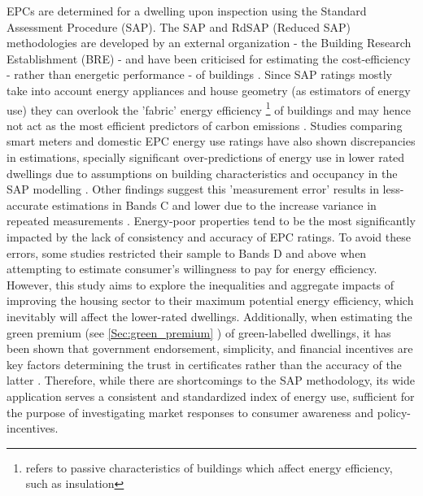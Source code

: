 EPCs are determined for a dwelling upon inspection using the Standard Assessment Procedure (SAP). The SAP and RdSAP (Reduced SAP) methodologies are developed by an external organization - the Building Research Establishment (BRE) - and have been criticised for estimating the cost-efficiency - rather than energetic performance - of buildings \cite{kelly_building_2012}. Since SAP ratings mostly take into account energy appliances and house geometry (as estimators of energy use) \cite{department_for_communities_and_local_government_guide_2017, bre_group_standard_nodate} they can overlook the 'fabric' energy efficiency \cite{bolton_energy_2024} \footnote{refers to passive characteristics of buildings which affect energy efficiency, such as insulation} of buildings and may hence not act as the most efficient predictors of carbon emissions \cite{stone_key_2014}. Studies comparing smart meters and domestic EPC energy use ratings have also shown discrepancies in estimations, specially significant over-predictions of energy use in lower rated dwellings due to assumptions on building characteristics and occupancy in the SAP modelling \cite{few_over-prediction_2023}. Other findings suggest this 'measurement error' results in less-accurate estimations in Bands C and lower due to the increase variance in repeated measurements \cite{crawley_quantifying_2019}. Energy-poor properties tend to be the most significantly impacted by the lack of consistency and accuracy of EPC ratings. To avoid these errors, some studies restricted their sample to Bands D and above \cite{ghosh_homebuyers_2024} when attempting to estimate consumer's willingness to pay for energy efficiency. However, this study aims to explore the inequalities and aggregate impacts of improving the housing sector to their maximum potential energy efficiency, which inevitably will affect the lower-rated dwellings. Additionally, when estimating the green premium (see \ref{Sec:green_premium} ) of green-labelled dwellings, it has been shown that government endorsement, simplicity, and financial incentives are key factors determining the trust in certificates rather than the accuracy of the latter \cite{banerjee_eco-labeling_2003, mutter_increasing_2012, martiskainen_role_2019}. Therefore, while there are shortcomings to the SAP methodology, its wide application serves a consistent and standardized index of energy use, sufficient for the purpose of investigating market responses to consumer awareness and policy-incentives. \\


